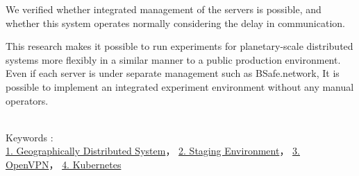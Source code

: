 We verified whether integrated management of the servers is possible, and whether this system operates normally considering the delay in communication.

This research makes it possible to run experiments for planetary-scale distributed systems more flexibly in a similar manner to a public production environment.
Even if each server is under separate management such as BSafe.network,
It is possible to implement an integrated experiment environment without any manual operators.

~ \\
Keywords : \\
\underline{1. Geographically Distributed System}，
\underline{2. Staging Environment}，
\underline{3. OpenVPN}，
\underline{4. Kubernetes}
\begin{flushright}
\edept \\
\eauthor
\end{flushright}
